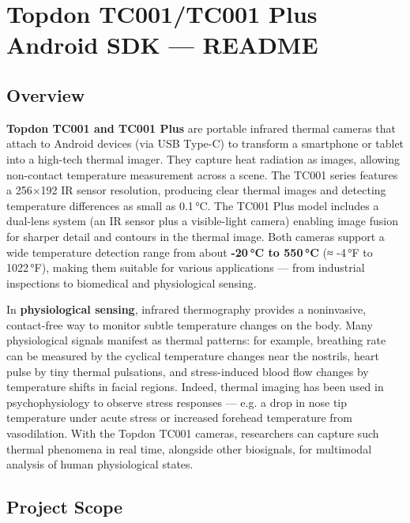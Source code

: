 \chapter{Topdon TC001/TC001 Plus Android SDK --- README}

\section{Overview}

\textbf{Topdon TC001 and TC001 Plus} are portable infrared thermal cameras
that attach to Android devices (via USB Type-C) to transform a
smartphone or tablet into a high-tech thermal
imager\cite{ref1}.
They capture heat radiation as images, allowing non-contact temperature
measurement across a scene. The TC001 series features a 256×192 IR
sensor resolution, producing clear thermal images and detecting
temperature differences as small as
0.1 °C\cite{ref2}\cite{ref3}.
The TC001 Plus model includes a dual-lens system (an IR sensor plus a
visible-light camera) enabling image fusion for sharper detail and
contours in the thermal
image\cite{ref4}\cite{ref3}.
Both cameras support a wide temperature detection range from about
\textbf{-20 °C to 550 °C} (≈ -4 °F to
1022 °F)\cite{ref5}\cite{ref6},
making them suitable for various applications --- from industrial
inspections to biomedical and physiological sensing.

In \textbf{physiological sensing}, infrared thermography provides a
noninvasive, contact-free way to monitor subtle temperature changes on
the
body\cite{ref7}\cite{ref8}.
Many physiological signals manifest as thermal patterns: for example,
breathing rate can be measured by the cyclical temperature changes near
the nostrils, heart pulse by tiny thermal pulsations, and stress-induced
blood flow changes by temperature shifts in facial
regions\cite{ref9}.
Indeed, thermal imaging has been used in psychophysiology to observe
stress responses --- e.g. a drop in nose tip temperature under acute
stress or increased forehead temperature from
vasodilation\cite{ref10}.
With the Topdon TC001 cameras, researchers can capture such thermal
phenomena in real time, alongside other biosignals, for multimodal
analysis of human physiological states.

\section{Project Scope}

